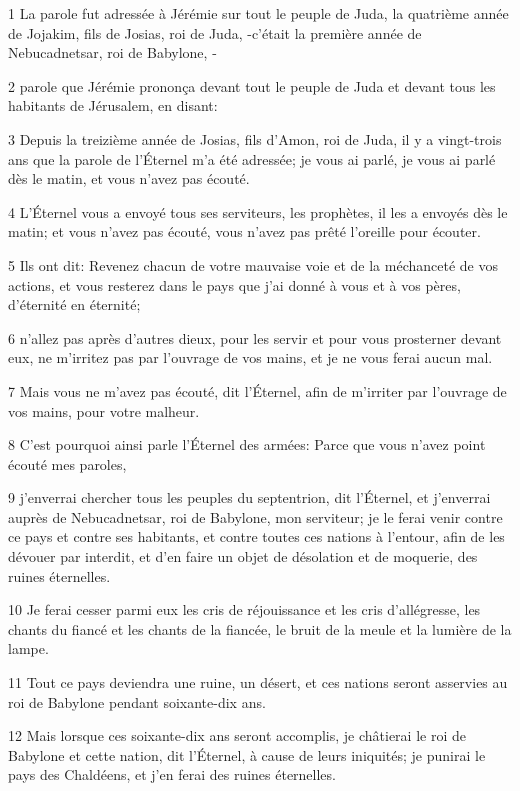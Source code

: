 \par 1 La parole fut adressée à Jérémie sur tout le peuple de Juda, la quatrième année de Jojakim, fils de Josias, roi de Juda, -c'était la première année de Nebucadnetsar, roi de Babylone, -
\par 2 parole que Jérémie prononça devant tout le peuple de Juda et devant tous les habitants de Jérusalem, en disant:
\par 3 Depuis la treizième année de Josias, fils d'Amon, roi de Juda, il y a vingt-trois ans que la parole de l'Éternel m'a été adressée; je vous ai parlé, je vous ai parlé dès le matin, et vous n'avez pas écouté.
\par 4 L'Éternel vous a envoyé tous ses serviteurs, les prophètes, il les a envoyés dès le matin; et vous n'avez pas écouté, vous n'avez pas prêté l'oreille pour écouter.
\par 5 Ils ont dit: Revenez chacun de votre mauvaise voie et de la méchanceté de vos actions, et vous resterez dans le pays que j'ai donné à vous et à vos pères, d'éternité en éternité;
\par 6 n'allez pas après d'autres dieux, pour les servir et pour vous prosterner devant eux, ne m'irritez pas par l'ouvrage de vos mains, et je ne vous ferai aucun mal.
\par 7 Mais vous ne m'avez pas écouté, dit l'Éternel, afin de m'irriter par l'ouvrage de vos mains, pour votre malheur.
\par 8 C'est pourquoi ainsi parle l'Éternel des armées: Parce que vous n'avez point écouté mes paroles,
\par 9 j'enverrai chercher tous les peuples du septentrion, dit l'Éternel, et j'enverrai auprès de Nebucadnetsar, roi de Babylone, mon serviteur; je le ferai venir contre ce pays et contre ses habitants, et contre toutes ces nations à l'entour, afin de les dévouer par interdit, et d'en faire un objet de désolation et de moquerie, des ruines éternelles.
\par 10 Je ferai cesser parmi eux les cris de réjouissance et les cris d'allégresse, les chants du fiancé et les chants de la fiancée, le bruit de la meule et la lumière de la lampe.
\par 11 Tout ce pays deviendra une ruine, un désert, et ces nations seront asservies au roi de Babylone pendant soixante-dix ans.
\par 12 Mais lorsque ces soixante-dix ans seront accomplis, je châtierai le roi de Babylone et cette nation, dit l'Éternel, à cause de leurs iniquités; je punirai le pays des Chaldéens, et j'en ferai des ruines éternelles.

